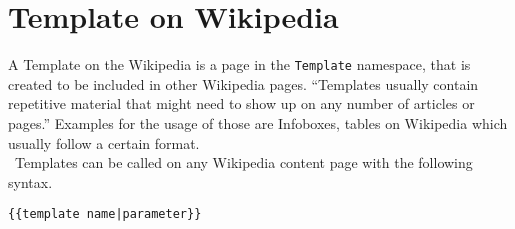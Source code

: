 \section{Template on Wikipedia}

A Template on the Wikipedia is a page in the \texttt{\justify Template} namespace, that is created to be included in other Wikipedia pages. ``Templates usually contain repetitive material that might need to show up on any number of articles or pages.'' \citep{wiki:21} Examples for the usage of those are Infoboxes, tables on Wikipedia which usually follow a certain format. \\\
Templates can be called on any Wikipedia content page with the following syntax. \\
\begin{lstlisting}[frame=single] 
{{template name|parameter}}
\end{lstlisting}
